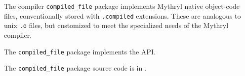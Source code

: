 
The compiler {\tt compiled\_file} package implements Mythryl native object-code files, 
conventionally stored with {\tt .compiled} extensions.  These are analogous to unix 
{\tt .o} files, but customized to meet the specialized needs of the Mythryl 
compiler.

The {\tt compiled\_file} package implements the  API.

The {\tt compiled\_file} package source code is in .

